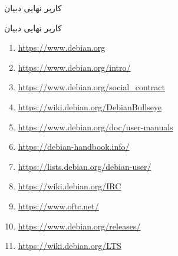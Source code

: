 \documentclass[hyperref={colorlinks}]{beamer}
\begin{document}
\begin{persian}

\begin{frame}{کاربر نهایی دبیان}
\begin{block}{کاربر نهایی دبیان}
\begin{latin}

\footnotesize{

\begin{enumerate}
	\normalsize\raggedleft
	\setlength{\itemsep}{-.1em}
	\item \url{https://www.debian.org}
	\item  \url{https://www.debian.org/intro/}
	\item \url{https://www.debian.org/social_contract}
	\item \url{https://wiki.debian.org/DebianBullseye}
	\item \url{https://www.debian.org/doc/user-manuals}
	\item \url{https://debian-handbook.info/}
	\item \url{https://lists.debian.org/debian-user/}
	\item \url{https://wiki.debian.org/IRC}
	\item \url{https://www.oftc.net/}
	\item \url{https://www.debian.org/releases/}
	\item \url{https://wiki.debian.org/LTS}
\end{enumerate}
}
\end{latin}

\end{block}
\end{frame}

\end{persian}
\end{document}
